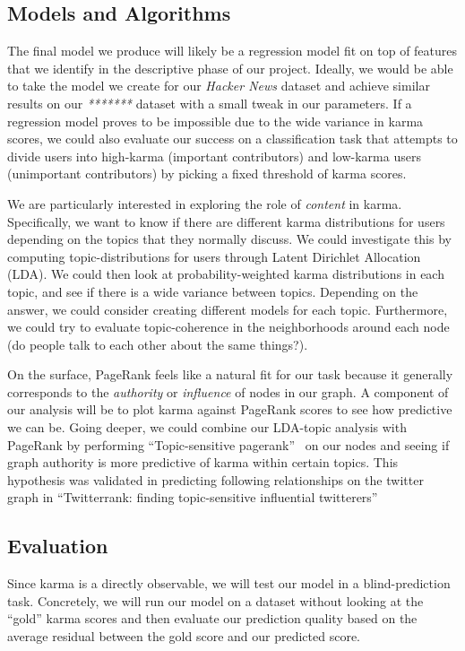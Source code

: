 \documentclass[11pt]{article}
\newcommand{\titlecite}[2]{``#1''~\cite{#2}}
\begin{document}
\subsection{Models and Algorithms}
\label{sec:models}
The final model we produce will likely be a regression model fit on top of
features that we identify in the descriptive phase of our project. Ideally, we
would be able to take the model we create for our \textit{Hacker News} dataset
and achieve similar results on our \textit{*******} dataset with a small tweak
in our parameters. If a regression model proves to be impossible due to the wide
variance in karma scores, we could also evaluate our success on a classification
task that attempts to divide users into high-karma (important contributors) and
low-karma users (unimportant contributors) by picking a fixed threshold of karma
scores.

We are particularly interested in exploring the role of \textit{content} in
karma. Specifically, we want to know if there are different karma distributions
for users depending on the topics that they normally discuss. We could 
investigate this by computing topic-distributions for users through Latent
Dirichlet Allocation (LDA). We could then look at probability-weighted karma
distributions in each topic, and see if there is a wide variance between topics.
Depending on the answer, we could consider creating different models for each
topic. Furthermore, we could try to evaluate topic-coherence in the
neighborhoods around each node (do people talk to each other about the same
things?).

On the surface, PageRank feels like a natural fit for our task because it
generally corresponds to the \textit{authority} or \textit{influence} of nodes
in our graph. A component of our analysis will be to plot karma against PageRank
scores to see how predictive we can be.  Going deeper, we could combine our
LDA-topic analysis with PageRank by performing \titlecite{Topic-sensitive
pagerank}{haveliwala2002topic} on our nodes and seeing if graph authority is
more predictive of karma within certain topics. This hypothesis was validated in
predicting following relationships on the twitter graph in
\titlecite{Twitterrank: finding topic-sensitive influential
twitterers}{weng2010twitterrank}

\subsection{Evaluation}
Since karma is a directly observable, we will test our model in a
blind-prediction task. Concretely, we will run our model on a dataset without
looking at the ``gold'' karma scores and then evaluate our prediction quality
based on the average residual between the gold score and our predicted score.
\end{document}
